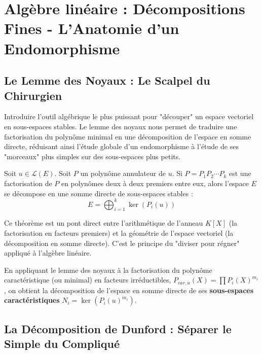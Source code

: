 \chapter{Algèbre linéaire : Décompositions Fines - L'Anatomie d'un Endomorphisme}

\section{Le Lemme des Noyaux : Le Scalpel du Chirurgien}

\begin{objectif}
    Introduire l'outil algébrique le plus puissant pour "découper" un espace vectoriel en sous-espaces stables. Le lemme des noyaux nous permet de traduire une factorisation du polynôme minimal en une décomposition de l'espace en somme directe, réduisant ainsi l'étude globale d'un endomorphisme à l'étude de ses "morceaux" plus simples sur des sous-espaces plus petits.
\end{objectif}

\begin{theorem}
    Soit $u \in \mathcal{L}(E)$. Soit $P$ un polynôme annulateur de $u$. Si $P = P_1 P_2 \cdots P_k$ est une factorisation de $P$ en polynômes deux à deux premiers entre eux, alors l'espace $E$ se décompose en une somme directe de sous-espaces stables :
    $$ E = \bigoplus_{i=1}^k \ker(P_i(u)) $$
\end{theorem}
\begin{remark}
    Ce théorème est un pont direct entre l'arithmétique de l'anneau $K[X]$ (la factorisation en facteurs premiers) et la géométrie de l'espace vectoriel (la décomposition en somme directe). C'est le principe du "diviser pour régner" appliqué à l'algèbre linéaire.
\end{remark}

\begin{definition}
    En appliquant le lemme des noyaux à la factorisation du polynôme caractéristique (ou minimal) en facteurs irréductibles, $P_{car,u}(X) = \prod P_i(X)^{m_i}$, on obtient la décomposition de l'espace en somme directe de ses \textbf{sous-espaces caractéristiques} $N_i = \ker(P_i(u)^{m_i})$.
\end{definition}

\section{La Décomposition de Dunford : Séparer le Simple du Compliqué}

